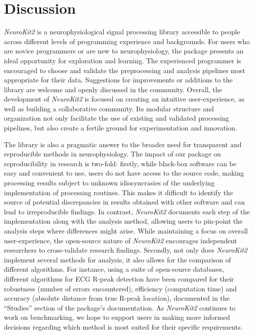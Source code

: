 \documentclass[
  english,
  man,floatsintext]{apa6}
\begin{document}
\hypertarget{discussion}{%
\section{Discussion}\label{discussion}}

\emph{NeuroKit2} is a neurophysiological signal processing library accessible to people across different levels of programming experience and backgrounds. For users who are novice programmers or are new to neurophysiology, the package presents an ideal opportunity for exploration and learning. The experienced programmer is encouraged to choose and validate the preprocessing and analysis pipelines most appropriate for their data. Suggestions for improvements or additions to the library are welcome and openly discussed in the community. Overall, the development of \emph{NeuroKit2} is focused on creating an intuitive user-experience, as well as building a collaborative community. Its modular structure and organization not only facilitate the use of existing and validated processing pipelines, but also create a fertile ground for experimentation and innovation.

The library is also a pragmatic answer to the broader need for transparent and reproducible methods in neurophysiology. The impact of our package on reproducibility in research is two-fold: firstly, while black-box software can be easy and convenient to use, users do not have access to the source code, making processing results subject to unknown idiosyncrasies of the underlying implementation of processing routines. This makes it difficult to identify the source of potential discrepancies in results obtained with other software and can lead to irreproducible findings. In contrast, \emph{NeuroKit2} documents each step of the implementation along with the analysis method, allowing users to pin-point the analysis steps where differences might arise. While maintaining a focus on overall user-experience, the open-source nature of \emph{NeuroKit2} encourages independent researchers to cross-validate research findings. Secondly, not only does \emph{NeuroKit2} implement several methods for analysis, it also allows for the comparison of different algorithms. For instance, using a suite of open-source databases, different algorithms for ECG R-peak detection have been compared for their robustness (number of errors encountered), efficiency (computation time) and accuracy (absolute distance from true R-peak location), documented in the \enquote{Studies} section of the package's documentation. As \emph{NeuroKit2} continues to work on benchmarking, we hope to support users in making more informed decisions regarding which method is most suited for their specific requirements.
\end{document}
